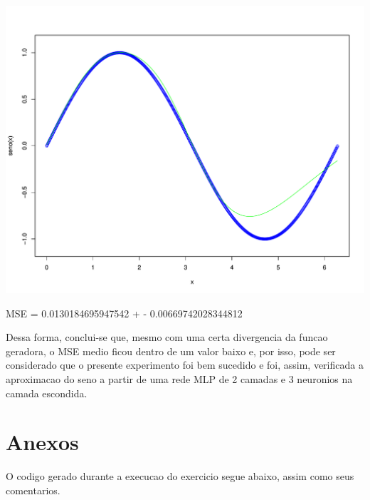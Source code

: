 \documentclass{article}
\begin{document}
\begin{center}
\includegraphics{ex9_AndreWerneck-004}
\end{center}

\begin{Schunk}
\begin{Soutput}
MSE = 0.0130184695947542 + - 0.00669742028344812
\end{Soutput}
\end{Schunk}

Dessa forma, conclui-se que, mesmo com uma certa divergencia da funcao geradora, o MSE medio ficou dentro de um valor baixo e, por isso, pode ser considerado que o presente experimento foi bem sucedido e foi, assim, verificada a aproximacao do seno a partir de uma rede MLP de 2 camadas e 3 neuronios na camada escondida.


\section{Anexos}

O codigo gerado durante a execucao do exercicio segue abaixo, assim como seus comentarios.
\end{document}
